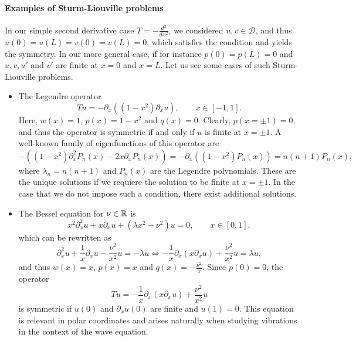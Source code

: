 \paragraph{Examples of Sturm-Liouville problems} In our simple second derivative case $T=-\frac{d^2}{dx^2}$, we considered $u,v\in\mathcal{D}$, and thus $u(0)=u(L)=v(0)=v(L)=0$, which satisfies the condition and yields the symmetry. In our more general case, if for instance $p(0)=p(L)=0$ and $u,v,u'$ and $v'$ are finite at $x=0$ and $x=L$. Let us see some cases of such Sturm-Liouville problems. 
\begin{itemize}
    \item The Legendre operator 
    \begin{equation*}
        Tu = -\partial_x ((1-x^2)\partial_x u),\qquad x\in[-1,1].
    \end{equation*}
    Here, $w(x)=1$, $p(x)=1-x^2$ and $q(x)=0$. Clearly, $p(x=\pm 1) = 0$, and thus the operator is symmetric if and only if $u$ is finite at $x = \pm 1$. A well-known family of eigenfunctions of this operator are 
    \begin{equation*}
        -((1-x^2)\partial_x^2 P_n(x) - 2x\partial_x P_n(x)) = -\partial_x ((1-x^2)P_n(x)) = n(n+1)P_n(x),
    \end{equation*}
    where $\lambda_n = n(n+1)$ and $P_n(x)$ are the Legendre polynomials. These are the unique solutions if we requiere the solution to be finite at $x= \pm 1$. In the case that we do not impose such a condition, there exist additional solutions. 
    \item The Bessel equation for $\nu\in\mathbb{R}$ is 
    \begin{equation*}
        x^2 \partial_x^2 u + x\partial_x u + (\lambda x^2 - \nu^2)u = 0,\qquad x\in[0,1],
    \end{equation*}
    which can be rewritten as 
    \begin{equation*}
        \partial_x^2 u + \frac{1}{x}\partial_x u - \frac{\nu^2}{x^2}u = -\lambda u \iff -\frac{1}{x}\partial_x (x\partial_x u) + \frac{\nu^2}{x^2} u = \lambda u,
    \end{equation*}
    and thus $w(x)=x$, $p(x)=x$ and $q(x)=-\frac{\nu^2}{x}$. Since $p(0)=0$, the operator 
    \begin{equation*}
        Tu = -\frac{1}{x}\partial_x (x\partial_x u) + \frac{\nu^2}{x^2}u
    \end{equation*}
    is symmetric if $u(0)$ and $\partial_x u(0)$ are finite and $u(1)=0$. This equation is relevant in polar coordinates and arises naturally when studying vibrations in the context of the wave equation. 

\end{itemize}
